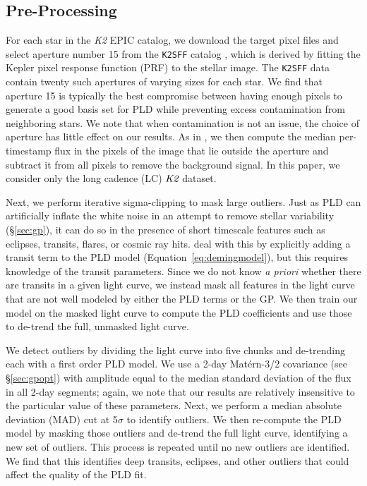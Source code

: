 \documentclass[]{emulateapj}
\begin{document}
\subsection{Pre-Processing}
\label{sec:pre}
For each star in the \emph{K2} EPIC catalog, we download the target pixel files and
select aperture number 15 from the \texttt{K2SFF} catalog \citep{VJ14, VAN14}, which is derived
by fitting the Kepler pixel response function (PRF) to the stellar image. The \texttt{K2SFF}
data contain twenty such apertures of varying sizes for each star. We find that aperture 15
is typically the best compromise between having enough pixels to generate a good basis
set for PLD while preventing excess contamination from neighboring stars. We note that
when contamination is not an issue, the choice of aperture has little effect on our results.
As in \cite{VJ14}, we then compute the median per-timestamp flux in the pixels of the image 
that lie outside the aperture and subtract it from all pixels
to remove the background signal. In this paper, we consider only the long cadence (LC)
$\emph{K2}$ dataset.

Next, we perform iterative sigma-clipping to mask large outliers. Just
as PLD can artificially inflate the white noise in an attempt to remove stellar
variability (\S\ref{sec:gp}), it can do so in the presence of short timescale features
such as eclipses, transits, flares, or cosmic ray hits. \cite{DEM15} deal with this
by explicitly adding a transit term to the PLD model (Equation~\ref{eq:demingmodel}),
but this requires knowledge of the transit parameters. Since we do not
know \emph{a priori} whether there are transits in a given light curve, we instead 
mask all features in the light curve that are not well modeled by either the PLD
terms or the GP. We then train our model on the masked light curve to compute the
PLD coefficients and use those to de-trend the full, unmasked light curve.

We detect outliers by dividing the light curve into five chunks and de-trending each
with a first order PLD model. We use a 2-day Mat\'ern-3/2
covariance (see \S\ref{sec:gpopt}) with amplitude equal to the median standard deviation
of the flux in all 2-day segments; again, we note that our results are relatively
insensitive to the particular value of these parameters. Next, we perform a
median absolute deviation (MAD) cut at 5$\sigma$ to identify outliers.
We then re-compute the PLD model by masking those outliers and de-trend the full
light curve, identifying a new set of outliers. This process is repeated until no new outliers
are identified. We find that this identifies deep transits, eclipses, and
other outliers that could affect the quality of the PLD fit.
\end{document}
